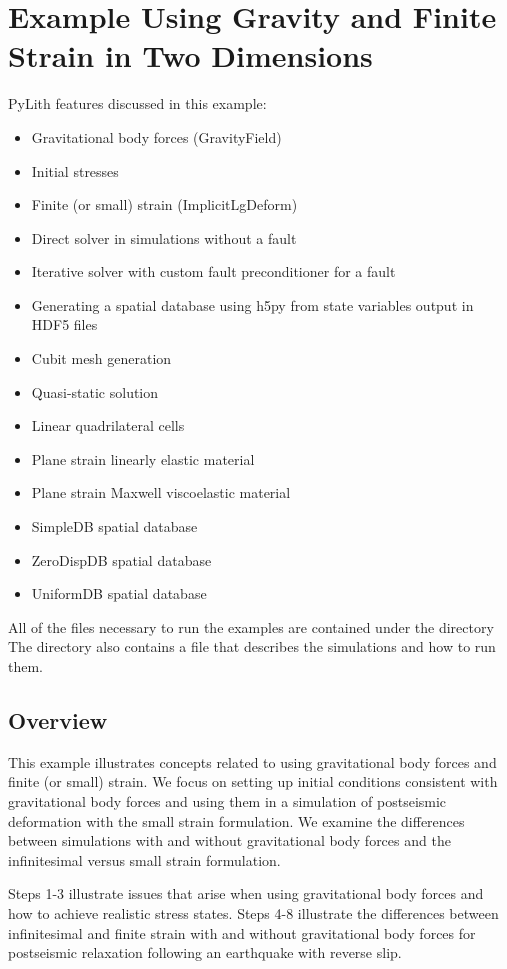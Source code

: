 \section{Example Using Gravity and Finite Strain in Two Dimensions}
\label{sec:example:grav2d}

PyLith features discussed in this example:
\begin{itemize}
\item Gravitational body forces (GravityField)
\item Initial stresses
\item Finite (or small) strain (ImplicitLgDeform)
\item Direct solver in simulations without a fault
\item Iterative solver with custom fault preconditioner for a fault
\item Generating a spatial database using h5py from state variables output
in HDF5 files
\item Cubit mesh generation
\item Quasi-static solution
\item Linear quadrilateral cells
\item Plane strain linearly elastic material
\item Plane strain Maxwell viscoelastic material
\item SimpleDB spatial database
\item ZeroDispDB spatial database
\item UniformDB spatial database
\end{itemize}
All of the files necessary to run the examples are contained under
the directory The directory also contains
a  file that describes the simulations and how to run
them.


\subsection{Overview}

This example illustrates concepts related to using gravitational
body forces and finite (or small) strain. We focus on setting up initial
conditions consistent with gravitational body forces and using them
in a simulation of postseismic deformation with the small strain formulation.
We examine the differences between simulations with and without gravitational
body forces and the infinitesimal versus small strain formulation.

Steps 1-3 illustrate issues that arise when using gravitational body
forces and how to achieve realistic stress states. Steps 4-8 illustrate
the differences between infinitesimal and finite strain with and without
gravitational body forces for postseismic relaxation following an
earthquake with reverse slip.



